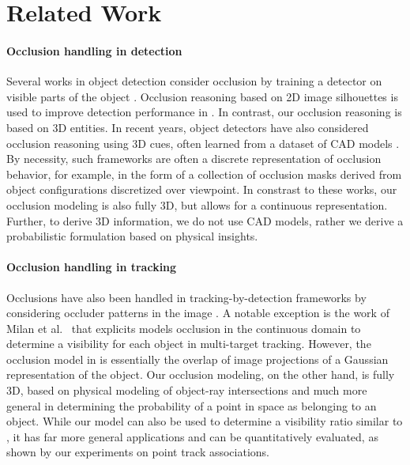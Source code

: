 \section{Related Work}
\label{sec:related}

\paragraph{Occlusion handling in detection}
Several works in object detection consider occlusion by training a detector on visible parts of the object \cite{Gao_etal_2011}. Occlusion reasoning based on 2D image silhouettes is used to improve detection performance in \cite{Hsiao_Herbert_2012}. In contrast, our occlusion reasoning is based on 3D entities. In recent years, object detectors have also considered occlusion reasoning using 3D cues, often learned from a dataset of CAD models \cite{Pepik_etal_2012,Pepik_etal_2013,Xiang_Savarese_2013}. By necessity, such frameworks are often a discrete representation of occlusion behavior, for example, in the form of a collection of occlusion masks derived from object configurations discretized over viewpoint. In constrast to these works, our occlusion modeling is also fully 3D, but allows for a continuous representation. Further, to derive 3D information, we do not use CAD models, rather we derive a probabilistic formulation based on physical insights.


\vspace{-0.3cm}
\paragraph{Occlusion handling in tracking}
Occlusions have also been handled in tracking-by-detection frameworks by considering occluder patterns in the image \cite{Kwak_etal_2012,Wu_Nevatia_2007}. A notable exception is the work of Milan et al.~\cite{Milan_etal_2014} that explicits models occlusion in the continuous domain to determine a visibility for each object in multi-target tracking. However, the occlusion model in \cite{Milan_etal_2014} is essentially the overlap of image projections of a Gaussian representation of the object. Our occlusion modeling, on the other hand, is fully 3D, based on physical modeling of object-ray intersections and much more general in determining the probability of a point in space as belonging to an object. While our model can also be used to determine a visibility ratio similar to \cite{Milan_etal_2014}, it has far more general applications and can be quantitatively evaluated, as shown by our experiments on point track associations.



